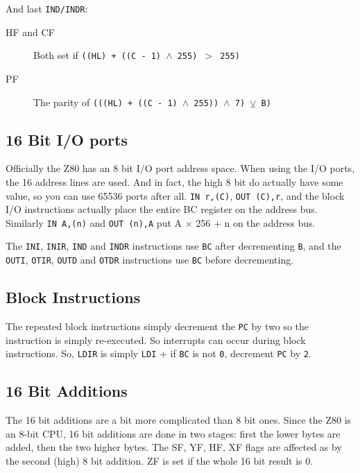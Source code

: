 And last {\tt IND/INDR}:

\begin{description}

    \item[HF and CF]
    Both set if {\tt ((HL) + ((C - 1) $\wedge$ 255) $>$ 255)}

    \item[PF]
    The parity of {\tt (((HL) + ((C - 1) $\wedge$ 255)) $\wedge$ 7) $\veebar$ B)}

\end{description}


\subsection{16 Bit I/O ports}

Officially the Z80 has an 8 bit I/O port address space. When using the I/O ports, the 16 address lines are used. And in fact, the high 8 bit do actually have some value, so you can use 65536 ports after all. {\tt IN r,(C)}, {\tt OUT (C),r}, and the block I/O instructions  actually place the entire BC register on the address bus. Similarly {\tt IN A,(n)} and {\tt OUT (n),A} put A $\times$ 256 + n on the address bus.

The {\tt INI}, {\tt INIR}, {\tt IND} and {\tt INDR} instructions use {\tt BC} after decrementing {\tt B}, and the {\tt OUTI}, {\tt OTIR}, {\tt OUTD} and {\tt OTDR} instructions use {\tt BC} before decrementing.


\subsection{Block Instructions}

The repeated block instructions simply decrement the {\tt PC} by two so the instruction is simply re-executed. So interrupts can occur during block instructions. So, {\tt LDIR} is simply {\tt LDI} + if {\tt BC} is not {\tt 0}, decrement {\tt PC} by {\tt 2}.


\subsection{16 Bit Additions}

The 16 bit additions are a bit more complicated than 8 bit ones. Since the Z80 is an 8-bit CPU, 16 bit additions are done in two stages: first the lower bytes are added, then the two higher bytes. The SF, YF, HF, XF flags are affected as by the second (high) 8 bit addition. ZF is set if the whole 16 bit result is 0.


